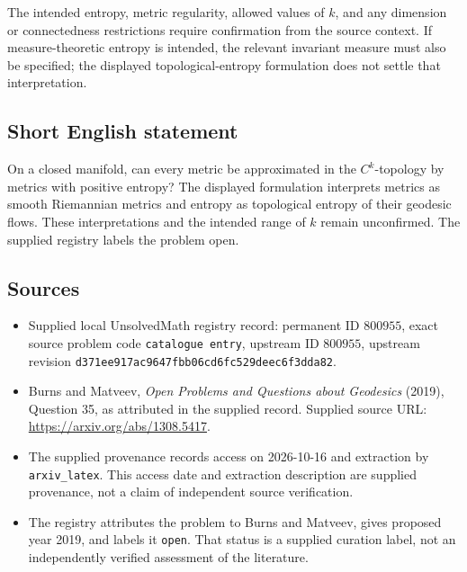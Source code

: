 \documentclass[11pt]{article}
\begin{document}
The intended entropy, metric regularity, allowed values of \(k\), and any dimension or connectedness restrictions require confirmation from the source context. If measure-theoretic entropy is intended, the relevant invariant measure must also be specified; the displayed topological-entropy formulation does not settle that interpretation.
\subsection{Short English statement}
On a closed manifold, can every metric be approximated in the \(C^k\)-topology by metrics with positive entropy? The displayed formulation interprets metrics as smooth Riemannian metrics and entropy as topological entropy of their geodesic flows. These interpretations and the intended range of \(k\) remain unconfirmed. The supplied registry labels the problem open.
\subsection{Sources}
\begin{itemize}
\item Supplied local UnsolvedMath registry record: permanent ID \(800955\), exact source problem code \texttt{catalogue entry}, upstream ID \(800955\), upstream revision \texttt{d371ee917ac9647fbb06cd6fc529deec6f3dda82}.
\item Burns and Matveev, \emph{Open Problems and Questions about Geodesics} (2019), Question 35, as attributed in the supplied record. Supplied source URL: \url{https://arxiv.org/abs/1308.5417}.
\item The supplied provenance records access on 2026-10-16 and extraction by \texttt{arxiv\_latex}. This access date and extraction description are supplied provenance, not a claim of independent source verification.
\item The registry attributes the problem to Burns and Matveev, gives proposed year 2019, and labels it \texttt{open}. That status is a supplied curation label, not an independently verified assessment of the literature.
\end{itemize}
\end{document}
